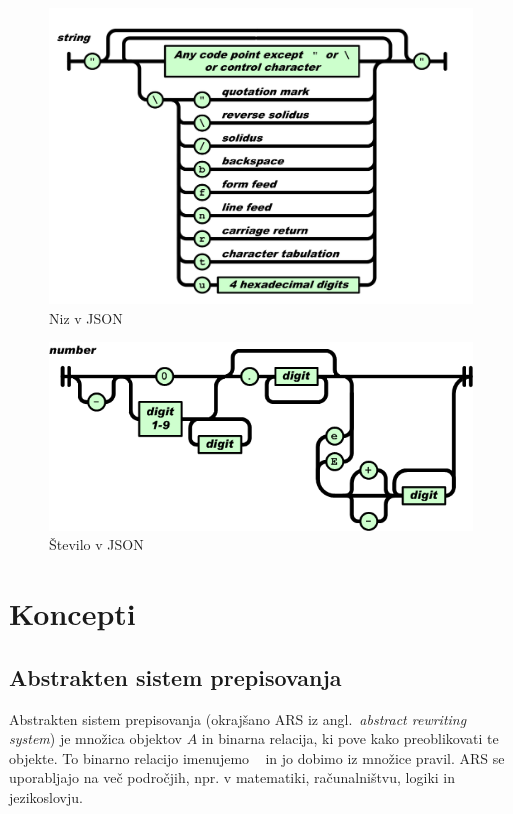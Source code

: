 \documentclass[12pt]{report}
\newcommand{\anglimp}[1]{angl.~\emph{#1}}
\newcommand{\angokr}[2]{(okrajšano #1 iz \anglimp{#2})}
\begin{document}
			\begin{figure}[H]
				\centering
				\includegraphics[width=\textwidth]{json_string.png}
				\caption{Niz v JSON~\cite{ecma404}}
				\label{fig:json_str}
			\end{figure}
			\begin{figure}[H]
				\centering
				\includegraphics[width=\textwidth]{json_number.png}
				\caption{Število v JSON~\cite{ecma404}}
				\label{fig:json_num}
			\end{figure}
	\section{Koncepti} %
		\subsection{Abstrakten sistem prepisovanja}
			Abstrakten sistem prepisovanja \angokr{ARS}{abstract rewriting system} je množica objektov $A$ in binarna relacija, ki pove kako preoblikovati te objekte.
			To binarno relacijo imenujemo ~\cite[p.~7]{terese} in jo dobimo iz množice pravil.
			ARS se uporabljajo na več področjih, npr. v matematiki, računalništvu, logiki in jezikoslovju.
\end{document}
